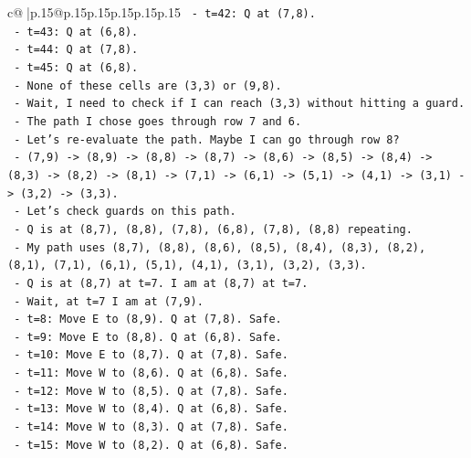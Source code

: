 \documentclass{article}
\begin{document}
{\begin{supertabular}{c@{$\;$}|p{.15\linewidth}@{}p{.15\linewidth}p{.15\linewidth}p{.15\linewidth}p{.15\linewidth}p{.15\linewidth}}
{{{\texttt{            {-}   t=42: Q at (7,8).} \\
\texttt{            {-}   t=43: Q at (6,8).} \\
\texttt{            {-}   t=44: Q at (7,8).} \\
\texttt{            {-}   t=45: Q at (6,8).} \\
\texttt{            {-}   None of these cells are (3,3) or (9,8).} \\
\texttt{            {-}   Wait, I need to check if I can reach (3,3) without hitting a guard.} \\
\texttt{            {-}   The path I chose goes through row 7 and 6.} \\
\texttt{            {-}   Let's re{-}evaluate the path. Maybe I can go through row 8?} \\
\texttt{            {-}   (7,9) {-}> (8,9) {-}> (8,8) {-}> (8,7) {-}> (8,6) {-}> (8,5) {-}> (8,4) {-}> (8,3) {-}> (8,2) {-}> (8,1) {-}> (7,1) {-}> (6,1) {-}> (5,1) {-}> (4,1) {-}> (3,1) {-}> (3,2) {-}> (3,3).} \\
\texttt{            {-}   Let's check guards on this path.} \\
\texttt{            {-}   Q is at (8,7), (8,8), (7,8), (6,8), (7,8), (8,8) repeating.} \\
\texttt{            {-}   My path uses (8,7), (8,8), (8,6), (8,5), (8,4), (8,3), (8,2), (8,1), (7,1), (6,1), (5,1), (4,1), (3,1), (3,2), (3,3).} \\
\texttt{            {-}   Q is at (8,7) at t=7. I am at (8,7) at t=7.} \\
\texttt{            {-}   Wait, at t=7 I am at (7,9).} \\
\texttt{            {-}   t=8: Move E to (8,9). Q at (7,8). Safe.} \\
\texttt{            {-}   t=9: Move E to (8,8). Q at (6,8). Safe.} \\
\texttt{            {-}   t=10: Move E to (8,7). Q at (7,8). Safe.} \\
\texttt{            {-}   t=11: Move W to (8,6). Q at (6,8). Safe.} \\
\texttt{            {-}   t=12: Move W to (8,5). Q at (7,8). Safe.} \\
\texttt{            {-}   t=13: Move W to (8,4). Q at (6,8). Safe.} \\
\texttt{            {-}   t=14: Move W to (8,3). Q at (7,8). Safe.} \\
\texttt{            {-}   t=15: Move W to (8,2). Q at (6,8). Safe.} \\
}}}
\end{supertabular}}
\end{document}
